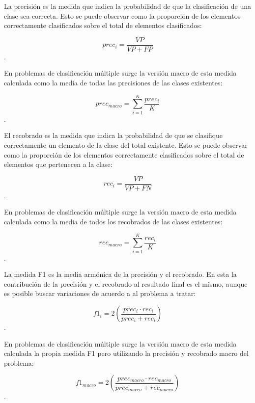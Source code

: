 La precisión es la medida que indica la probabilidad de que la clasificación de una clase sea correcta. Esto 
se puede observar como la proporción de los elementos correctamente clasificados sobre el total de 
elementos clasificados:

\begin{equation}
	prec_i = \frac{VP}{VP + FP}
\end{equation}.

En problemas de clasificación múltiple surge la versión macro de esta medida calculada como la media de todas
las precisiones de las clases existentes:

\begin{equation}
	prec_{macro} = \sum^K_{i=1} \frac{prec_i}{K}
\end{equation}.

El recobrado es la medida que indica la probabilidad de que se clasifique correctamente un elemento de la clase
del total existente. Esto se puede observar como la proporción de los elementos correctamente clasificados sobre el 
total de elementos que pertenecen a la clase:

\begin{equation}
	rec_i = \frac{VP}{VP + FN}
\end{equation}.

En problemas de clasificación múltiple surge la versión macro de esta medida calculada como la media de todos
los recobrados de las clases existentes:

\begin{equation}
	rec_{macro} = \sum^K_{i=1} \frac{rec_i}{K}
\end{equation}.

La medida F1 es la media armónica de la precisión y el recobrado. En esta la contribución de la precisión y el
recobrado al resultado final es el mismo, aunque es posible buscar variaciones de acuerdo a al problema a tratar:

\begin{equation}
	f1_i = 2 (\frac{prec_i · rec_i}{prec_i + rec_i})
\end{equation}.

En problemas de clasificación múltiple surge la versión macro de esta medida calculada la propia medida F1 pero
utilizando la precisión y recobrado macro del problema:

\begin{equation}
	f1_{macro} = 2 (\frac{prec_{macro} · rec_{macro}}{prec_{macro} + rec_{macro}})
\end{equation}.

